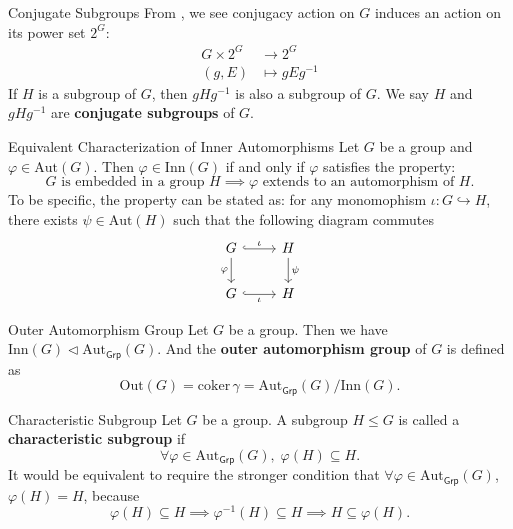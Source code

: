 \begin{definition}{Conjugate Subgroups}{}
    From , we see conjugacy action on $G$ induces an action on its power set $2^G$: \begin{align*}
        G\times 2^G & \longrightarrow 2^G  \\
        (g,E)       & \longmapsto gEg^{-1}
    \end{align*}
    If $H$ is a subgroup of $G$, then $gHg^{-1}$ is also a subgroup of $G$. We say $H$ and $gHg^{-1}$ are \textbf{conjugate subgroups} of $G$.
\end{definition}

\begin{proposition}{Equivalent
        Characterization of Inner Automorphisms}{}
    Let $G$ be a group and $\varphi \in \mathrm{Aut}(G)$. Then $\varphi \in \mathrm{Inn}(G)$ if and only if $\varphi$ satisfies the property:
    \[
        \text{$G$ is embedded in a group $H$} \implies \text{$\varphi$ extends to an automorphism of $H$}.
    \]
    To be specific, the property can be stated as: for any monomophism $\iota:G\hookrightarrow H$,
    there exists $\psi\in \mathrm{Aut}(H)$ such that the following diagram commutes
    \[
        \begin{tikzcd}[ampersand replacement=\&]
            G \arrow[r, hook, "\iota"] \arrow[d, "\varphi"'] \& H \arrow[d, "\psi"] \\
            G \arrow[r, hook, "\iota"']                      \& H
        \end{tikzcd}
    \]
\end{proposition}




\begin{definition}{Outer Automorphism Group}{}
    Let $G$ be a group. Then we have $\mathrm{Inn}(G) \lhd \mathrm{Aut}_{\mathsf{Grp}}(G)$. And the \textbf{outer automorphism group} of $G$ is defined as
    $$
        \mathrm{Out}(G)=\mathrm{coker}\,\gamma=\mathrm{Aut}_{\mathsf{Grp}}(G)/\mathrm{Inn}(G).
    $$
\end{definition}

\begin{definition}{Characteristic Subgroup}{}
    Let $G$ be a group. A subgroup $H\le G$ is called a \textbf{characteristic subgroup} if
    \[
        \forall \varphi \in\mathrm{Aut}_{\mathsf{Grp}}(G),\; \varphi(H)\subseteq H.
    \]
    It would be equivalent to require the stronger condition that $\forall \varphi \in\mathrm{Aut}_{\mathsf{Grp}}(G)$, $\varphi(H)= H$, because
    \[
        \varphi(H)\subseteq H\implies \varphi^{-1}(H)\subseteq H\implies H\subseteq \varphi(H).
    \]
\end{definition}

